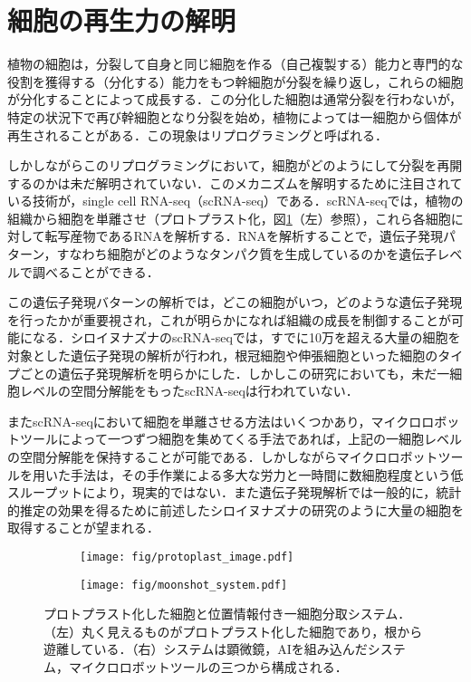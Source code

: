 \thispagestyle{fancy2}

\section{細胞の再生力の解明}
\label{sec:regeneration}

植物の細胞は，分裂して自身と同じ細胞を作る（自己複製する）能力と専門的な役割を獲得する（分化する）能力をもつ幹細胞が分裂を繰り返し，これらの細胞が分化することによって成長する\cite{sakamoto2022transcriptional}．この分化した細胞は通常分裂を行わないが，特定の状況下で再び幹細胞となり分裂を始め，植物によっては一細胞から個体が再生されることがある．この現象はリプログラミングと呼ばれる．

しかしながらこのリプログラミングにおいて，細胞がどのようにして分裂を再開するのかは未だ解明されていない．このメカニズムを解明するために注目されている技術が，single cell RNA-seq（scRNA-seq）\cite{kolodziejczyk2015technology}である．scRNA-seqでは，植物の組織から細胞を単離させ（プロトプラスト化\cite{pasternak2020single}，図\ref{fig:protoplast_and_main_system}（左）参照），これら各細胞に対して転写産物であるRNAを解析する．RNAを解析することで，遺伝子発現パターン，すなわち細胞がどのようなタンパク質を生成しているのかを遺伝子レベルで調べることができる\cite{xiao2012transcriptome,sakamoto2022transcriptional}．

この遺伝子発現バターンの解析では，どこの細胞がいつ，どのような遺伝子発現を行ったかが重要視され，これが明らかになれば組織の成長を制御することが可能になる．シロイヌナズナのscRNA-seq\cite{shahan2022single}では，すでに10万を超える大量の細胞を対象とした遺伝子発現の解析が行われ，根冠細胞や伸張細胞といった細胞のタイプごとの遺伝子発現解析を明らかにした．しかしこの研究においても，未だ一細胞レベルの空間分解能をもったscRNA-seqは行われていない．

またscRNA-seqにおいて細胞を単離させる方法はいくつかあり\cite{kolodziejczyk2015technology}，マイクロロボットツールによって一つずつ細胞を集めてくる手法であれば，上記の一細胞レベルの空間分解能を保持することが可能である．しかしながらマイクロロボットツールを用いた手法は，その手作業による多大な労力と一時間に数細胞程度という低スループットにより，現実的ではない．また遺伝子発現解析では一般的に，統計的推定の効果を得るために前述したシロイヌナズナの研究のように大量の細胞を取得することが望まれる．

\begin{figure}[t]
    \centering
    \begin{subfigure}[t]{0.27\linewidth}
        \centering
        \texttt{[image: fig/protoplast\_image.pdf]}
    \end{subfigure}
    \hfill
    \begin{subfigure}[t]{0.67\linewidth}
        \centering
        \texttt{[image: fig/moonshot\_system.pdf]}
    \end{subfigure}
    \caption[プロトプラスト化した細胞と位置情報付き一細胞分取システム]{プロトプラスト化した細胞と位置情報付き一細胞分取システム．（左）丸く見えるものがプロトプラスト化した細胞であり，根から遊離している．（右）システムは顕微鏡，AIを組み込んだシステム，マイクロロボットツールの三つから構成される．}
    \label{fig:protoplast_and_main_system}
\end{figure}

